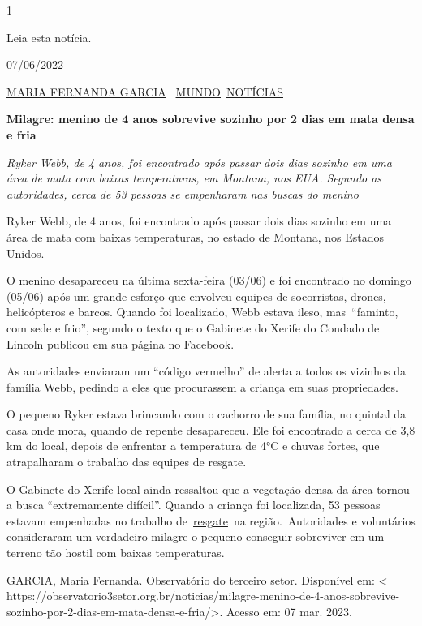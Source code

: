 \begin{itemize}
{{{\begin{itemize}
\begin{itemize}
\begin{itemize}

\num{1}

Leia esta notícia.

07/06/2022

\href{https://observatorio3setor.org.br/author/maria-fernanda-garcia/}{MARIA
FERNANDA GARCIA}~
\href{https://observatorio3setor.org.br/category/noticias/mundo/}{MUNDO}~\href{https://observatorio3setor.org.br/category/noticias/}{NOTÍCIAS}

\textbf{Milagre: menino de 4 anos sobrevive sozinho por 2 dias em mata
densa e fria}

\emph{Ryker Webb, de 4 anos, foi encontrado após passar dois dias
sozinho em uma área de mata com baixas temperaturas, em Montana, nos
EUA. Segundo as autoridades, cerca de 53 pessoas se empenharam nas
buscas do menino}

Ryker Webb, de 4 anos, foi encontrado após passar dois dias sozinho em
uma área de mata com baixas temperaturas, no estado de Montana, nos
Estados Unidos.

O menino desapareceu na última sexta-feira (03/06) e foi encontrado no
domingo (05/06) após um grande esforço que envolveu equipes de
socorristas, drones, helicópteros e barcos. Quando foi localizado, Webb
estava ileso, mas~``faminto, com sede e frio'', segundo o texto que o
Gabinete do Xerife do Condado de Lincoln publicou em sua página no
Facebook.

As autoridades enviaram um ``código vermelho'' de alerta a todos os
vizinhos da família Webb, pedindo a eles que procurassem a criança em
suas propriedades.

O pequeno Ryker estava brincando com o cachorro de sua família, no
quintal da casa onde mora, quando de repente desapareceu. Ele foi
encontrado a cerca de 3,8 km do local, depois de enfrentar a temperatura
de 4°C e chuvas fortes, que atrapalharam o trabalho das equipes de
resgate.

O Gabinete do Xerife local ainda ressaltou que a vegetação densa da área
tornou a busca ``extremamente difícil''. Quando a criança foi
localizada, 53 pessoas estavam empenhadas no trabalho
de~\href{https://observatorio3setor.org.br/noticias/gato-ajuda-equipe-de-resgate-a-encontrar-idosa-apos-acidente/}{resgate}~na
região.~Autoridades e voluntários consideraram um verdadeiro milagre o
pequeno conseguir sobreviver em um terreno tão hostil com baixas
temperaturas.

GARCIA, Maria Fernanda. Observatório do terceiro setor. Disponível em:
\textless{}
https://observatorio3setor.org.br/noticias/milagre-menino-de-4-anos-sobrevive-sozinho-por-2-dias-em-mata-densa-e-fria/\textgreater{}.
Acesso em: 07 mar. 2023.


\end{itemize}
\end{itemize}
\end{itemize}}}}
\end{itemize}
